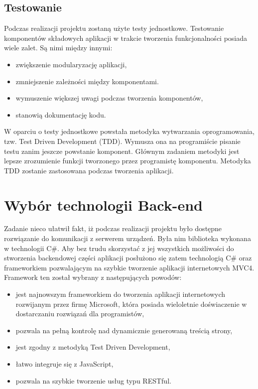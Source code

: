 \subsection{Testowanie}
Podczas realizacji projektu zostaną użyte testy jednostkowe. Testowanie komponentów składowych aplikacji w trakcie tworzenia funkcjonalności posiada wiele zalet. Są nimi między innymi\cite{tests-book}:
\begin{itemize}
\item zwiększenie modularyzację aplikacji,
\item zmniejszenie zależności między komponentami.
\item wymuszenie większej uwagi podczas tworzenia komponentów,
\item stanowią dokumentację kodu.
\end{itemize}

W oparciu o testy jednostkowe powstała metodyka wytwarzania oprogramowania, tzw. Test Driven Development (TDD)\cite{tests-book}. Wymusza ona na programiście pisanie testu zanim jeszcze powstanie komponent. Głównym zadaniem metodyki jest lepsze zrozumienie funkcji tworzonego przez programistę komponentu. 
Metodyka TDD zostanie zastosowana podczas tworzenia aplikacji.

\section{Wybór technologii Back-end}

Zadanie nieco ułatwił fakt, iż podczas realizacji projektu było dostępne rozwiązanie do komunikacji z serwerem urządzeń. Była nim biblioteka wykonana w technologii C\#. Aby bez trudu skorzystać z jej wszystkich możliwości do stworzenia backendowej części aplikacji posłużono się zatem technologią C\# oraz frameworkiem pozwalającym na szybkie tworzenie aplikacji internetowych MVC4. Framework ten został wybrany z następujących powodów\cite{mvc-book}:

\begin{itemize}
\item jest najnowszym frameworkiem do tworzenia aplikacji internetowych rozwijanym przez firmę Microsoft, która posiada wieloletnie doświaczenie w dostarczaniu rozwiązań dla programistów,
\item pozwala na pełną kontrolę nad dynamicznie generowaną treścią strony,
\item jest zgodny z metodyką Test Driven Development,
\item łatwo integruje się z JavaScript,
\item pozwala na szybkie tworzenie usług typu RESTful.
\end{itemize}


